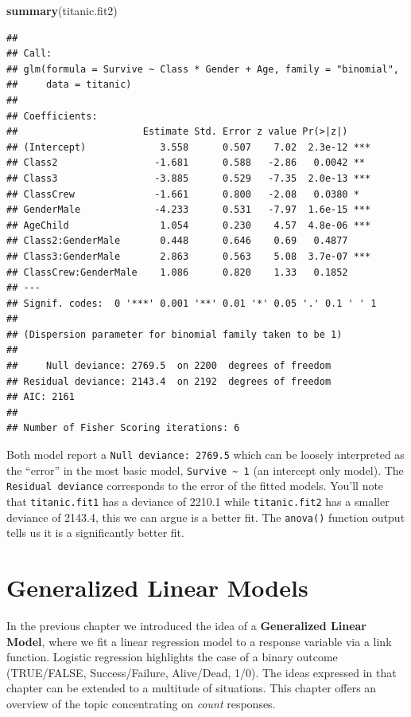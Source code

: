 \documentclass[
]{book}
\newenvironment{Shaded}{\begin{snugshade}}{\end{snugshade}}
\newcommand{\FunctionTok}[1]{\textcolor[rgb]{0.13,0.29,0.53}{\textbf{#1}}}
\newcommand{\NormalTok}[1]{#1}
\begin{document}
\begin{Shaded}
\begin{Highlighting}[]
\FunctionTok{summary}\NormalTok{(titanic.fit2)}
\end{Highlighting}
\end{Shaded}

\begin{verbatim}
## 
## Call:
## glm(formula = Survive ~ Class * Gender + Age, family = "binomial", 
##     data = titanic)
## 
## Coefficients:
##                      Estimate Std. Error z value Pr(>|z|)    
## (Intercept)             3.558      0.507    7.02  2.3e-12 ***
## Class2                 -1.681      0.588   -2.86   0.0042 ** 
## Class3                 -3.885      0.529   -7.35  2.0e-13 ***
## ClassCrew              -1.661      0.800   -2.08   0.0380 *  
## GenderMale             -4.233      0.531   -7.97  1.6e-15 ***
## AgeChild                1.054      0.230    4.57  4.8e-06 ***
## Class2:GenderMale       0.448      0.646    0.69   0.4877    
## Class3:GenderMale       2.863      0.563    5.08  3.7e-07 ***
## ClassCrew:GenderMale    1.086      0.820    1.33   0.1852    
## ---
## Signif. codes:  0 '***' 0.001 '**' 0.01 '*' 0.05 '.' 0.1 ' ' 1
## 
## (Dispersion parameter for binomial family taken to be 1)
## 
##     Null deviance: 2769.5  on 2200  degrees of freedom
## Residual deviance: 2143.4  on 2192  degrees of freedom
## AIC: 2161
## 
## Number of Fisher Scoring iterations: 6
\end{verbatim}

Both model report a \texttt{Null\ deviance:\ 2769.5} which can be loosely interpreted as the ``error'' in the most basic model, \texttt{Survive\ \textasciitilde{}\ 1} (an intercept only model). The \texttt{Residual\ deviance} corresponds to the error of the fitted models. You'll note that \texttt{titanic.fit1} has a deviance of 2210.1 while \texttt{titanic.fit2} has a smaller deviance of 2143.4, this we can argue is a better fit. The \texttt{anova()} function output tells us it is a significantly better fit.

\hypertarget{generalized-linear-models}{%
\chapter{Generalized Linear Models}\label{generalized-linear-models}}

In the previous chapter we introduced the idea of a \textbf{Generalized Linear Model}, where we fit a linear regression model to a response variable via a link function. Logistic regression highlights the case of a binary outcome (TRUE/FALSE, Success/Failure, Alive/Dead, 1/0). The ideas expressed in that chapter can be extended to a multitude of situations. This chapter offers an overview of the topic concentrating on \emph{count} responses.
\end{document}
